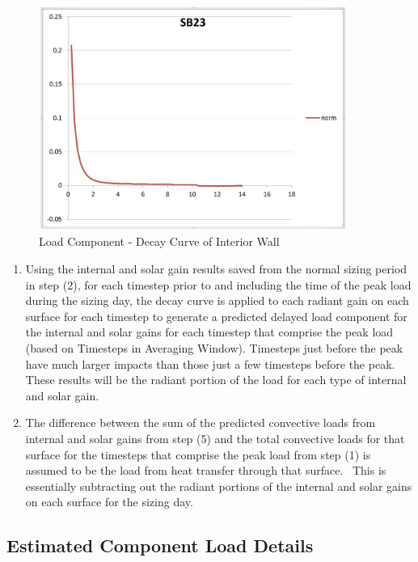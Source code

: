 \begin{figure}[hbtp] %
\centering
\includegraphics[width=0.9\textwidth, height=0.9\textheight, keepaspectratio=true]{media/image7913.png}
\caption{Load Component - Decay Curve of Interior Wall \protect \label{fig:load-component-decay-curve-of-interior-wall}}
\end{figure}

\begin{enumerate}
\def\labelenumi{\arabic{enumi})}
\setcounter{enumi}{4}
\item
  Using the internal and solar gain results saved from the normal sizing period in step (2), for each timestep prior to and including the time of the peak load during the sizing day, the decay curve is applied to each radiant gain on each surface for each timestep to generate a predicted delayed load component for the internal and solar gains for each timestep that comprise the peak load (based on Timesteps in Averaging Window). Timesteps just before the peak have much larger impacts than those just a few timesteps before the peak.~ These results will be the radiant portion of the load for each type of internal and solar gain.
\item
  The difference between the sum of the predicted convective loads from internal and solar gains from step (5) and the total convective loads for that surface for the timesteps that comprise the peak load from step (1) is assumed to be the load from heat transfer through that surface.~ This is essentially subtracting out the radiant portions of the internal and solar gains on each surface for the sizing day.
\end{enumerate}

\subsection{Estimated Component Load Details}\label{estimated-component-load-details}

